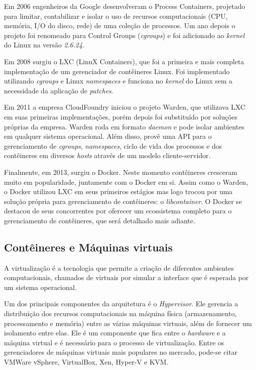 \documentclass[twosideprint]{politex}
\begin{document}
	Em 2006 engenheiros da Google desenvolveram o Process Containers, projetado para limitar, contabilizar e isolar o uso de recursos computacionais (CPU, memória, I/O do disco, rede) de uma coleção de processos. Um ano depois o projeto foi renomeado para Control Groups (\textit{cgroups}) e foi adicionado ao \textit{kernel} do Linux na versão \textit{2.6.24}.

	Em 2008 surgiu o LXC (LinuX Containers), que foi a primeira e mais completa implementação de um gerenciador de contêineres Linux. Foi implementado utilizando \textit{cgroups} e Linux \textit{namespaces} e funciona no \textit{kernel} do Linux sem a necessidade da aplicação de \textit{patches}.
	
	Em 2011 a empresa CloudFoundry iniciou o projeto Warden, que utilizava LXC em suas primeiras implementações, porém depois foi substituído por soluções próprias da empresa. Warden roda em formato \textit{daemon} e pode isolar ambientes em qualquer sistema operacional. Além disso, provê uma API para o gerenciamento de \textit{cgroups}, \textit{namespaces}, ciclo de vida dos processos e dos contêineres em diversos \textit{hosts} através de um modelo cliente-servidor.

	Finalmente, em 2013, surgiu o Docker. Neste momento contêineres cresceram muito em popularidade, juntamente com o Docker em si.
	Assim como o Warden, o Docker utilizou LXC em seus primeiros estágios mas logo trocou por uma solução própria para gerenciamento de contêineres: o \textit{libcontainer}.
	O Docker se destacou de seus concorrentes por oferecer um ecossistema completo para o gerenciamento de contêineres, que será detalhado mais adiante.
	
	\subsection{Contêineres e Máquinas virtuais}
	
	A virtualização é a tecnologia que permite a criação de diferentes ambientes computacionais, chamados de virtuais por simular a interface que é esperada por um sistema operacional.
	
	Um dos principais componentes da arquitetura é o \textit{Hypervisor}. Ele gerencia a distribuição dos recursos computacionais na máquina física (armazenamento, processamento e memória) entre as várias máquinas virtuais, além de fornecer um isolamento entre elas. Ele é um componente que fica entre o \textit{hardware} e a máquina virtual e é necessário para o processo de virtualização.
	Entre os gerenciadores de máquinas virtuais mais populares no mercado, pode-se citar VMWare vSphere, VirtualBox, Xen, Hyper-V e KVM.
\end{document}
